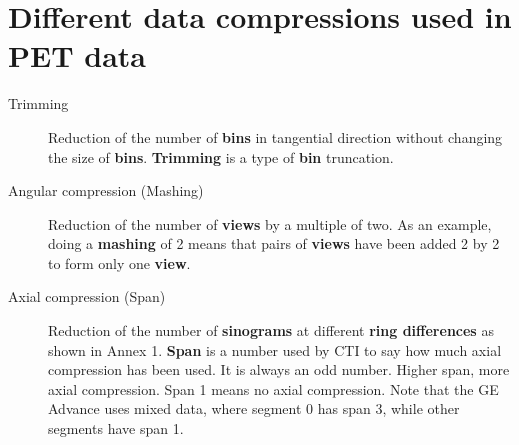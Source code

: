 \documentclass{article}
\begin{document}
\section*{Different data compressions used in PET data}
\begin{description}
\item[Trimming] 
Reduction of the number of \textbf{bins} in tangential direction without 
changing the size of \textbf{bins}. \textbf{Trimming} is a type of \textbf{bin} 
truncation.
\item[Angular compression (Mashing)] 
Reduction of the number of \textbf{views} by a multiple of two. As 
an example, doing a \textbf{mashing} of 2 means that pairs of \textbf{views} 
have been added 2 by 2 to form only one \textbf{view}.
\item[Axial compression (Span)] 
Reduction of the number of \textbf{sinograms} at different \textbf{ring 
differences} as shown in Annex 1. \textbf{Span} is a number used by 
CTI to say how much axial compression has been used. It is always 
an odd number. Higher span, more axial compression. Span 1 means 
no axial compression. Note that the GE Advance uses mixed data, 
where segment 0 has span 3, while other segments have span 1.
\end{description}
\end{document}
